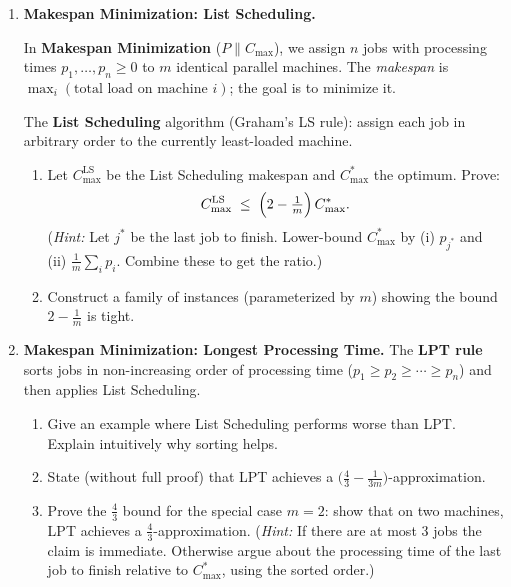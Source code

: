 \documentclass[9pt]{book}
\begin{document}
\begin{enumerate}[label=\arabic*.]
\bigskip

\item \textbf{Makespan Minimization: List Scheduling.}


In \textbf{Makespan Minimization} ($P\|C_{\max}$), we assign $n$ jobs with processing times
$p_1,\ldots,p_n\ge 0$ to $m$ identical parallel machines.
The \emph{makespan} is $\max_i(\text{total load on machine }i)$; the goal is to minimize it.

The \textbf{List Scheduling} algorithm (Graham's LS rule): assign each job in
        arbitrary order to the currently least-loaded machine.
  
\begin{enumerate}[label=(\alph*)]
  \item Let $C_{\max}^{\mathrm{LS}}$ be the List Scheduling makespan and $C_{\max}^*$ the
        optimum.  Prove:
        \[
          C_{\max}^{\mathrm{LS}} \;\le\; \Bigl(2-\tfrac{1}{m}\Bigr)\,C_{\max}^*.
        \]
        (\textit{Hint:} Let $j^*$ be the last job to finish.  Lower-bound $C_{\max}^*$ by
        (i) $p_{j^*}$ and (ii) $\frac{1}{m}\sum_i p_i$.  Combine these to get the ratio.)
  \item Construct a family of instances (parameterized by $m$) showing the bound
        $2-\tfrac{1}{m}$ is tight.
\end{enumerate}

\bigskip

\item \textbf{Makespan Minimization: Longest Processing Time.}
The \textbf{LPT rule} sorts jobs in non-increasing order of processing time
($p_1\ge p_2\ge\cdots\ge p_n$) and then applies List Scheduling.
\begin{enumerate}[label=(\alph*)]
  \item Give an example where List Scheduling performs worse than LPT.  Explain intuitively
        why sorting helps.
  \item State (without full proof) that LPT achieves a
        $\bigl(\frac{4}{3}-\frac{1}{3m}\bigr)$-approximation.
  \item Prove the $\frac{4}{3}$ bound for the special case $m=2$:
        show that on two machines, LPT achieves a $\frac{4}{3}$-approximation.
        (\textit{Hint:} If there are at most 3 jobs the claim is immediate.
        Otherwise argue about the processing time of the last job to finish relative to $C_{\max}^*$,
        using the sorted order.)
\end{enumerate}


\end{enumerate}
\end{document}
